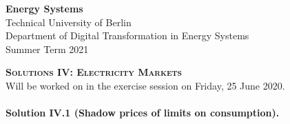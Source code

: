 \documentclass[11pt,a4paper,fleqn]{scrartcl}
\begin{document}
\begin{flushright}
  \textbf{Energy Systems}\\
  {\small Technical University of Berlin}\\
  {\small Department of Digital Transformation in Energy Systems}\\
  {\small Summer Term 2021}\\
 \end{flushright}
 
  
  \vspace{-0.5em}
  \hrulefill
  \vspace{0.3em}
 
 \begin{center}
  \textbf{\textsc{\Large Solutions IV: Electricity Markets}}\\
  \small Will be worked on in the exercise session on Friday, 25 June 2020.\\[1.5em]
 \end{center}
 

 \vspace{-0.5em}
 \hrulefill
 \vspace{0.8em}
 

\paragraph{Solution IV.1 \normalsize (Shadow prices of limits on consumption).}~\\
\end{document}
